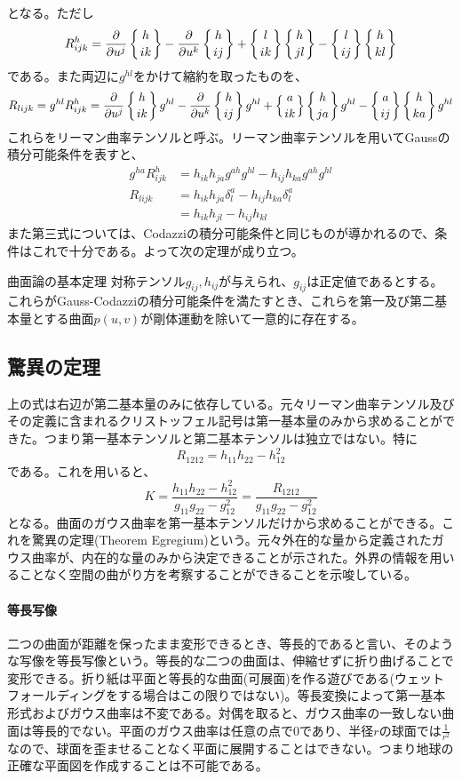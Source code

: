         となる。ただし
            \[R^h_{ijk} = \frac{\partial }{\partial u^j}\left\{h \atop ik\right\} - \frac{\partial }{\partial u^k}\left\{h \atop ij\right\} + \left\{l \atop ik\right\}\left\{h \atop jl\right\} - \left\{l \atop ij\right\}\left\{h \atop kl\right\}\]
        である。また両辺に$g^{hl}$をかけて縮約を取ったものを、
            \[R_{lijk} = g^{hl}R^h_{ijk} = \frac{\partial }{\partial u^j}\left\{h \atop ik\right\}g^{hl} - \frac{\partial }{\partial u^k}\left\{h \atop ij\right\}g^{hl} + \left\{a \atop ik\right\}\left\{h \atop ja\right\}g^{hl} - \left\{a \atop ij\right\}\left\{h \atop ka\right\}g^{hl}\]
        これらをリーマン曲率テンソルと呼ぶ。リーマン曲率テンソルを用いてGaussの積分可能条件を表すと、
        \begin{align*}
            g^{ha}R^h_{ijk} &= h_{ik}h_{ja}g^{ah}g^{hl} - h_{ij}h_{ka}g^{ah}g^{hl}\\
            R_{lijk} &= h_{ik}h_{ja}\delta_l^a - h_{ij}h_{ka}\delta_l^a\\
            &= h_{ik}h_{jl} - h_{ij}h_{kl}
        \end{align*}
        また第三式については、Codazziの積分可能条件と同じものが導かれるので、条件はこれで十分である。よって次の定理が成り立つ。
        \begin{thm}{曲面論の基本定理}
            対称テンソル$g_{ij}, h_{ij}$が与えられ、$g_{ij}$は正定値であるとする。これらがGauss-Codazziの積分可能条件を満たすとき、これらを第一及び第二基本量とする曲面$p(u,v)$が剛体運動を除いて一意的に存在する。
        \end{thm}


    \subsection{驚異の定理}
        上の式は右辺が第二基本量のみに依存している。元々リーマン曲率テンソル及びその定義に含まれるクリストッフェル記号は第一基本量のみから求めることができた。つまり第一基本テンソルと第二基本テンソルは独立ではない。特に
            \[R_{1212} = h_{11}h_{22} - h_{12}^2\]
        である。これを用いると、
            \[K = \frac{h_{11}h_{22} - h_{12}^2}{g_{11}g_{22} - g_{12}^2} = \frac{R_{1212}}{g_{11}g_{22}-g_{12}^2}\]
        となる。曲面のガウス曲率を第一基本テンソルだけから求めることができる。これを驚異の定理(Theorem Egregium)という。元々外在的な量から定義されたガウス曲率が、内在的な量のみから決定できることが示された。外界の情報を用いることなく空間の曲がり方を考察することができることを示唆している。


    \paragraph{等長写像}
        二つの曲面が距離を保ったまま変形できるとき、等長的であると言い、そのような写像を等長写像という。等長的な二つの曲面は、伸縮せずに折り曲げることで変形できる。折り紙は平面と等長的な曲面(可展面)を作る遊びである(ウェットフォールディングをする場合はこの限りではない)。等長変換によって第一基本形式およびガウス曲率は不変である。対偶を取ると、ガウス曲率の一致しない曲面は等長的でない。平面のガウス曲率は任意の点で0であり、半径$r$の球面では$\frac{1}{r^2}$なので、球面を歪ませることなく平面に展開することはできない。つまり地球の正確な平面図を作成することは不可能である。
